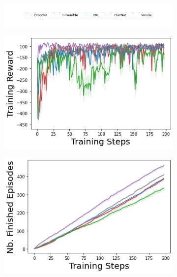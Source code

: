 \begin{figure}
    \centering
    \begin{subfigure}{.7\textwidth}
        \includegraphics[width=\textwidth]{sections/011_icml2022/resources/legend-standard.png}
    \end{subfigure}
    \vspace{-3mm}
    
    \begin{subfigure}{.3\textwidth}
        \includegraphics[width=\textwidth]{sections/011_icml2022/resources/acrobot-training_total_reward-training-model+.png}
    \end{subfigure}
    \begin{subfigure}{.3\textwidth}
        \includegraphics[width=\textwidth]{sections/011_icml2022/resources/acrobot-n_finished_training_episodes-training-model+.png}

\end{subfigure}
\end{figure}
